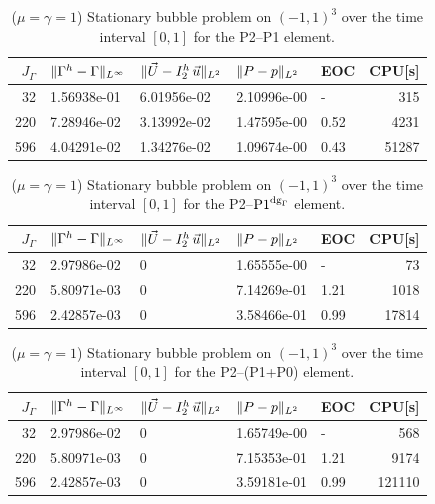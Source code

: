 \begin{table}
\center
\begin{tabular}{rllllr}
\hline
$J_\Gamma$ & $\|\Gamma^h - \Gamma\|_{L^\infty}$ & $\|\vec U - I^h_{2}\,\vec u\|_{L^2}$ & $\|P - p\|_{L^2}$ & EOC & CPU[s] \\
\hline
 32 & 1.56938e-01 & 6.01956e-02 & 2.10996e-00 &    - &   315 \\
220 & 7.28946e-02 & 3.13992e-02 & 1.47595e-00 & 0.52 &  4231 \\
596 & 4.04291e-02 & 1.34276e-02 & 1.09674e-00 & 0.43 & 51287 \\
\hline
\end{tabular}
\caption[Stokes 3d stationary bubble errors P2--P1]
{($\mu=\gamma=1$) Stationary bubble problem on $(-1,1)^3$ over the time
interval $[0,1]$ for the P2--P1 element.}
\label{tab:stokes_stationary_3d_p2p1}
\end{table}
\begin{table}
\center
\begin{tabular}{rllllr}
\hline
$J_\Gamma$ & $\|\Gamma^h - \Gamma\|_{L^\infty}$ & $\|\vec U - I^h_{2}\,\vec u\|_{L^2}$ & $\|P - p\|_{L^2}$ & EOC & CPU[s] \\
\hline
 32 & 2.97986e-02 & 0 & 1.65555e-00 &    - &    73 \\
220 & 5.80971e-03 & 0 & 7.14269e-01 & 1.21 &  1018 \\
596 & 2.42857e-03 & 0 & 3.58466e-01 & 0.99 & 17814 \\
\hline
\end{tabular}
\caption[Stokes 3d stationary bubble errors P2--$\pdg$]
{($\mu=\gamma=1$) Stationary bubble problem on $(-1,1)^3$ over the time
interval $[0,1]$ for the P2--$\pdg$ element.}
\label{tab:stokes_stationary_3d_p2p1dg}
\end{table}
\begin{table}
\center
\begin{tabular}{rllllr}
\hline
$J_\Gamma$ & $\|\Gamma^h - \Gamma\|_{L^\infty}$ & $\|\vec U - I^h_{2}\,\vec u\|_{L^2}$ & $\|P - p\|_{L^2}$ & EOC & CPU[s] \\
\hline
 32 & 2.97986e-02 & 0 & 1.65749e-00 &    - &    568 \\
220 & 5.80971e-03 & 0 & 7.15353e-01 & 1.21 &   9174 \\
596 & 2.42857e-03 & 0 & 3.59181e-01 & 0.99 & 121110 \\
\hline
\end{tabular}
\caption[Stokes 3d stationary bubble errors P2--(P1+P0)]
{($\mu=\gamma=1$) Stationary bubble problem on $(-1,1)^3$ over the time
interval $[0,1]$ for the P2--(P1+P0) element.}
\label{tab:stokes_stationary_3d_p2p1p0}
\end{table}

